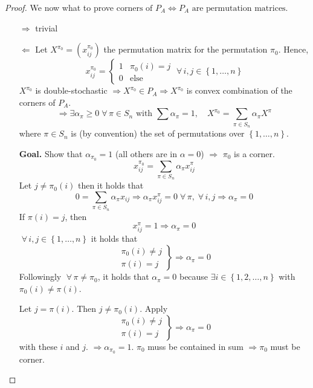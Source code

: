\documentclass{article}
\newcommand{\set}[1]{\left\{#1\right\}}
\newcommand{\fall}{\;\forall\,}
\begin{document}
\begin{proof}
  We now what to prove $\text{corners of } P_A \Leftrightarrow P_A \text{ are permutation matrices}$.

  \begin{itemize}
    \item[$\Rightarrow$] trivial
    \item[$\Leftarrow$]
      Let $X^{\pi_0} = (x_{ij}^{\pi_0})$ the permutation matrix for the permutation $\pi_0$. Hence,
      \[
        x_{ij}^{\pi_0} = \left\{\begin{array}{ll}
          1 & \pi_0(i) = j \\
          0 & \text{else}
        \end{array}\right.
        \fall i, j \in \set{1, \ldots, n}
      \]
      $X^{\pi_0}$ is double-stochastic $\Rightarrow X^{\pi_0} \in P_A \Rightarrow X^{\pi_0}$ is convex combination of the corners of $P_A$.
      \[
        \Rightarrow \exists \alpha_\pi \geq 0 \fall \pi \in S_n
          \text{ with } \sum \alpha_\pi = 1,
          \quad X^{\pi_0} = \sum_{\pi \in S_n} \alpha_\pi X^\pi
      \]
      where $\pi \in S_n$ is (by convention) the set of permutations over $\set{1, \ldots, n}$.

      \textbf{Goal.} Show that $\alpha_{\pi_0} = 1$ (all others are in $\alpha = 0$) $\Rightarrow$ $\pi_0$ is a corner.
      \[ x_{ij}^{\pi_0} = \sum_{\pi \in S_n} \alpha_\pi x_{ij}^\pi \]
      Let $j \neq \pi_0(i)$ then it holds that
      \[
        0 = \sum_{\pi \in S_n} \alpha_\pi x_{ij} \Rightarrow
        \alpha_\pi x_{ij}^\pi = 0 \fall \pi, \fall i,j \Rightarrow
        \alpha_\pi = 0
      \]
      If $\pi(i) = j$, then
      \[ x^\pi_{ij} = 1 \Rightarrow \alpha_\pi = 0 \]
      $\fall i, j \in \set{1, \ldots, n}$ it holds that
      \[
        \left.\begin{array}{c}
          \pi_0(i) \neq j \\
          \pi(i) = j
        \end{array}\right\}
        \Rightarrow \alpha_\pi = 0
      \]
      Followingly $\fall \pi \neq \pi_0$, it holds that $\alpha_\pi = 0$ because $\exists i \in \set{1, 2, \ldots, n}$ with $\pi_0(i) \neq \pi(i)$.

      Let $j = \pi(i)$. Then $j \neq \pi_0(i)$. Apply
      \[
        \left.\begin{array}{c}
          \pi_0(i) \neq j \\
          \pi(i) = j
        \end{array}\right\}
        \Rightarrow \alpha_\pi = 0
      \]
      with these $i$ and $j$. $\Rightarrow \alpha_{\pi_0} = 1$. $\pi_0$ muss be contained in sum $\Rightarrow \pi_0$ must be corner.
  \end{itemize}
\end{proof}
\end{document}
